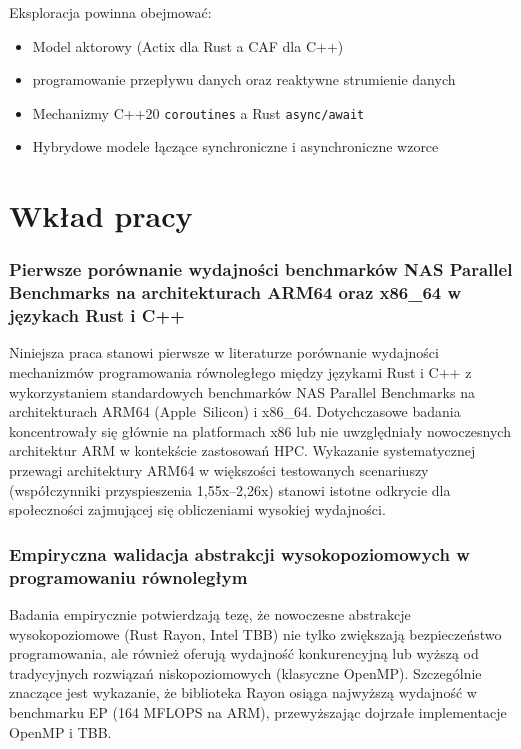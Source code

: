 Eksploracja powinna obejmować:
\begin{itemize}
    \item Model aktorowy (Actix dla Rust a CAF dla C++)
    \item programowanie przepływu danych oraz reaktywne strumienie danych
    \item Mechanizmy C++20 \texttt{coroutines} a Rust \texttt{async/await}
    \item Hybrydowe modele łączące synchroniczne i asynchroniczne wzorce
\end{itemize}


\section{Wkład pracy}

\subsubsection{Pierwsze porównanie wydajności benchmarków NAS Parallel Benchmarks na architekturach ARM64 oraz x86\_64 w językach Rust i C++}

Niniejsza praca stanowi pierwsze w literaturze porównanie wydajności mechanizmów programowania równoległego między językami Rust i C++ z wykorzystaniem standardowych benchmarków NAS Parallel Benchmarks na architekturach ARM64 \mbox{(Apple Silicon)} i x86\_64. Dotychczasowe badania koncentrowały się głównie na platformach x86 lub nie uwzględniały nowoczesnych architektur ARM w kontekście zastosowań HPC. Wykazanie systematycznej przewagi architektury ARM64 w większości testowanych scenariuszy (współczynniki przyspieszenia 1,55x--2,26x) stanowi istotne odkrycie dla społeczności zajmującej się obliczeniami wysokiej wydajności.

\subsubsection{Empiryczna walidacja abstrakcji wysokopoziomowych w programowaniu równoległym}

Badania empirycznie potwierdzają tezę, że nowoczesne abstrakcje wysokopoziomowe (Rust Rayon, Intel TBB) nie tylko zwiększają bezpieczeństwo programowania, ale również oferują wydajność konkurencyjną lub wyższą od tradycyjnych rozwiązań niskopoziomowych (klasyczne OpenMP). Szczególnie znaczące jest wykazanie, że biblioteka Rayon osiąga najwyższą wydajność w benchmarku EP (164 MFLOPS na ARM), przewyższając dojrzałe implementacje OpenMP i TBB.

